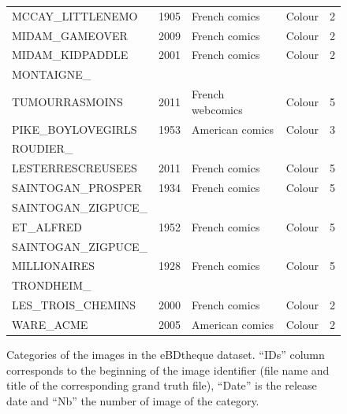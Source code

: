 \begin{figure}[!ht]
\begin{center}
\begin{tabular}{|lllll|}
	MCCAY\_LITTLENEMO                      & 1905        & French comics    & Colour     & 2        \\
	MIDAM\_GAMEOVER                        & 2009        & French comics    & Colour     & 2        \\
	MIDAM\_KIDPADDLE                       & 2001        & French comics    & Colour     & 2        \\
	MONTAIGNE\_ \\ TUMOURRASMOINS          & 2011        & French webcomics & Colour     & 5        \\
	PIKE\_BOYLOVEGIRLS                     & 1953        & American comics  & Colour     & 3        \\
	ROUDIER\_ \\ LESTERRESCREUSEES             & 2011        & French comics    & Colour     & 5        \\
	SAINTOGAN\_PROSPER 						& 1934        & French comics    & Colour     & 5        \\
	SAINTOGAN\_ZIGPUCE\_ \\ ET\_ALFRED           & 1952        & French comics    & Colour     & 5        \\
	SAINTOGAN\_ZIGPUCE\_ \\ MILLIONAIRES        & 1928        & French comics    & Colour     & 5        \\
	TRONDHEIM\_ \\ LES\_TROIS\_CHEMINS           & 2000        & French comics    & Colour     & 2        \\
	WARE\_ACME                             & 2005        & American comics  & Colour     & 2        \\
	\hline
	\end{tabular}
\caption[Categories of the images in the eBDtheque dataset]{Categories of the images in the eBDtheque dataset. ``IDs'' column corresponds to the beginning of the image identifier (file name and title of the corresponding grand truth file), ``Date'' is the release date and ``Nb'' the number of image of the category.}
\label{app:ebdtheque_image_classification}
\end{center}
\end{figure}	


